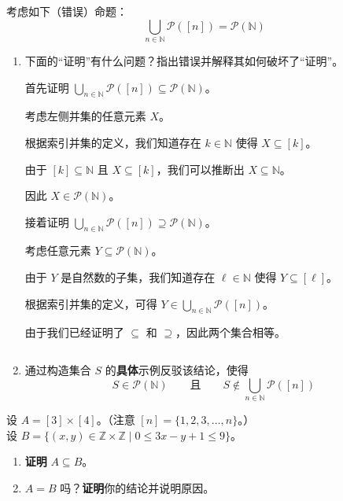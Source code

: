 \begin{exercise}
    考虑如下（错误）命题：
    \[\bigcup_{n \in \mathbb{N}}\mathcal{P}([n]) = \mathcal{P}(\mathbb{N})\]
    \begin{enumerate}[label=(\alph*)]
        \item 下面的``证明''有什么问题？指出错误并解释其如何破坏了``证明''。
            \begin{spoof}
                首先证明 $\displaystyle{\bigcup_{n \in \mathbb{N}}\mathcal{P}([n]) \subseteq \mathcal{P}(\mathbb{N})}$。

                考虑左侧并集的任意元素 $X$。

                根据索引并集的定义，我们知道存在 $k \in \mathbb{N}$ 使得 $X \subseteq [k]$。

                由于 $[k] \subseteq \mathbb{N}$ 且 $X \subseteq [k]$，我们可以推断出 $X \subseteq \mathbb{N}$。

                因此 $X \in \mathcal{P}(\mathbb{N})$。

                接着证明 $\displaystyle{\bigcup_{n \in \mathbb{N}}\mathcal{P}([n]) \supseteq \mathcal{P}(\mathbb{N})}$。

                考虑任意元素 $Y \subseteq \mathcal{P}(\mathbb{N})$。

                由于 $Y$ 是自然数的子集，我们知道存在 $\ell \in \mathbb{N}$ 使得 $Y \subseteq [\ell]$。

                根据索引并集的定义，可得 $\displaystyle{Y \in \bigcup_{n \in \mathbb{N}}\mathcal{P}([n])}$。

                由于我们已经证明了 $\subseteq$ 和 $\supseteq$，因此两个集合相等。
            \end{spoof}
            $\quad$
        \item 通过构造集合 $S$ 的\textbf{具体}示例反驳该结论，使得
            \[S \in \mathcal{P}(\mathbb{N}) \qquad \text{且} \qquad S \notin \bigcup_{n \in \mathbb{N}}\mathcal{P}([n])\]
    \end{enumerate}
\end{exercise}

\begin{exercise}
    设 $A = [3] \times [4]$。（注意 $[n] = \{1, 2, 3, \dots , n\}$。）\\
    设 $B = \{(x, y) \in \mathbb{Z} \times \mathbb{Z} \mid 0 \le 3x - y + 1 \le 9\}$。
    \begin{enumerate}[label=(\alph*)]
        \item \textbf{证明} $A \subseteq B$。
        \item $A = B$ 吗？\textbf{证明}你的结论并说明原因。
    \end{enumerate}
\end{exercise}

